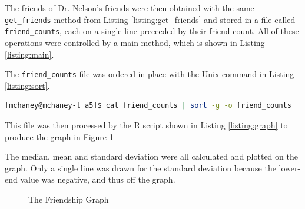 The friends of Dr. Nelson's friends were then obtained with the same {\tt get\_friends} method from Listing \ref{listing:get_friends} and stored in a file called {\tt friend\_counts}, each on a single line preceeded by their friend count. All of these operations were controlled by a main method, which is shown in Listing \ref{listing:main}.



\clearpage

The {\tt friend\_counts} file was ordered in place with the Unix command in Listing \ref{listing:sort}. 

\begin{lstlisting}[language=Bash,caption={Sort command},label=listing:sort]
[mchaney@mchaney-l a5]$ cat friend_counts | sort -g -o friend_counts
\end{lstlisting}

This file was then processed by the R script shown in Listing \ref{listing:graph} to produce the graph in Figure \ref{fig:friend_graph}



\clearpage
The median, mean and standard deviation were all calculated and plotted on the graph. Only a single line was drawn for the standard deviation because the lower-end value was negative, and thus off the graph.

\begin{figure}[h!]
\centering
{}
\caption{The Friendship Graph}
\label{fig:friend_graph}
\end{figure}